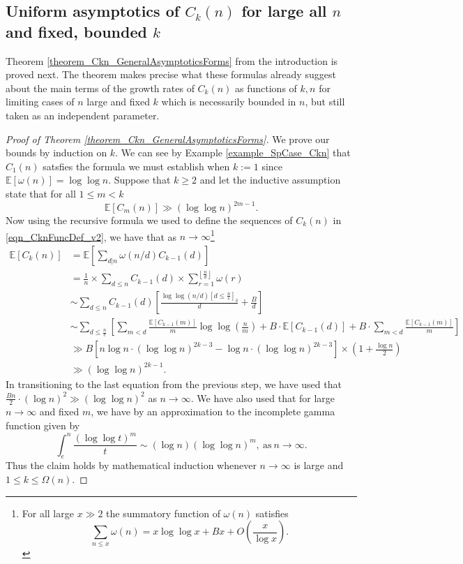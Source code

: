 \documentclass[11pt,reqno,a4letter]{article}
\numberwithin{figure}{section}
\numberwithin{table}{section}
\newcommand{\Iverson}[1]{\ensuremath{\left[#1\right]_{\delta}}}
\newcommand{\Floor}[2]{\ensuremath{\left\lfloor \frac{#1}{#2} \right\rfloor}}
\theoremstyle{plain}
\numberwithin{theorem}{section}
\theoremstyle{definition}
\newcommand{\NBRef}[1]{}
\begin{document}
\subsection{Uniform asymptotics of $C_k(n)$ for large all $n$ and fixed, bounded $k$} 

Theorem \ref{theorem_Ckn_GeneralAsymptoticsForms} from the introduction is proved next. 
The theorem makes precise what these formulas already 
suggest about the main terms of the growth rates of 
$C_k(n)$ as functions of $k,n$ for limiting cases of $n$ large and fixed $k$ which is 
necessarily bounded in $n$, but still taken as an independent parameter. 

\NBRef{A08-2020-04-26} 
\begin{proof}[Proof of Theorem \ref{theorem_Ckn_GeneralAsymptoticsForms}] 
\label{proofOf_theorem_Ckn_GeneralAsymptoticsForms} 
We prove our bounds by induction on $k$. 
We can see by Example \ref{example_SpCase_Ckn} that $C_1(n)$ 
satsfies the formula we must establish when $k := 1$ since $\mathbb{E}[\omega(n)] = \log\log n$. 
Suppose that $k \geq 2$ and let the inductive assumption state that for all $1 \leq m < k$ 
\[
\mathbb{E}[C_m(n)] \gg (\log\log n)^{2m-1}. 
\] 
Now using the recursive formula we used to define the sequences of $C_k(n)$ in 
\eqref{eqn_CknFuncDef_v2}, we have that as $n \rightarrow \infty$\footnote{ 
     For all large $x \gg 2$ the summatory function of $\omega(n)$ satisfies 
     \cite[\S 22.10]{HARDYWRIGHT} 
     \[
     \sum_{n \leq x} \omega(n) = x \log\log x + Bx + O\left(\frac{x}{\log x}\right). 
     \]
}
\begin{align*} 
\mathbb{E}[C_k(n)] & = \mathbb{E}\left[\sum_{d|n} \omega(n/d) C_{k-1}(d)\right] \\ 
     & = \frac{1}{n} \times \sum_{d \leq n} C_{k-1}(d) \times \sum_{r=1}^{\Floor{n}{d}} \omega(r) \\ 
     & \sim \sum_{d \leq n} C_{k-1}(d) \left[ 
     \frac{\log\log(n/d) \Iverson{d \leq \frac{n}{e}}}{d} + \frac{B}{d}\right] \\ 
     & \sim \sum_{d \leq \frac{n}{e}} \left[ 
     \sum_{m < d} \frac{\mathbb{E}[C_{k-1}(m)]}{m} \log\log\left(\frac{n}{m}\right) + 
     B \cdot \mathbb{E}[C_{k-1}(d)] + B \cdot \sum_{m < d} \frac{\mathbb{E}[C_{k-1}(m)]}{m} 
     \right] \\ 
     & \gg B \left[n \log n \cdot (\log\log n)^{2k-3} - \log n \cdot (\log\log n)^{2k-3}\right] \times 
     \left(1 + \frac{\log n}{2}\right) \\ 
     & \gg (\log\log n)^{2k-1}. 
\end{align*} 
In transitioning to the last equation from the previous step, we have used that 
$\frac{Bn}{2} \cdot (\log n)^2 \gg (\log\log n)^2$ as $n \rightarrow \infty$. We have also used that for large 
$n \rightarrow \infty$ and fixed $m$, we have by an approximation to the incomplete gamma function given by 
\[
\int_{e}^{n} \frac{(\log\log t)^m}{t} \sim (\log n) (\log\log n)^{m}, 
     \mathrm{\ as\ } n \rightarrow \infty. 
\]
Thus the claim holds by mathematical induction whenever $n \rightarrow \infty$ is large and 
$1 \leq k \leq \Omega(n)$. 
\end{proof} 
\end{document}
